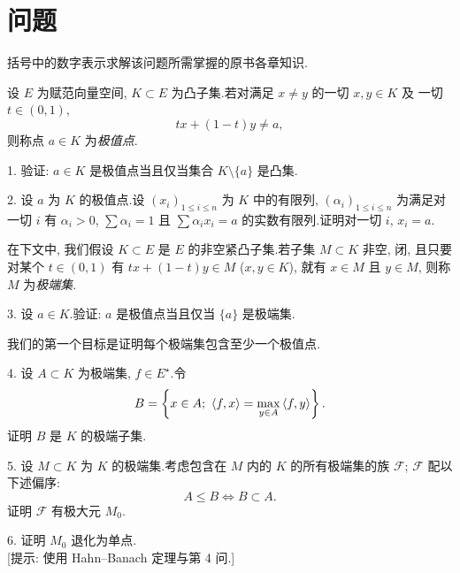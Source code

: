 
\chapter*{问题}

括号中的数字表示求解该问题所需掌握的原书各章知识.

\begin{problem}
\label{prob:1}
设 $E$ 为赋范向量空间, $K\subset E$ 为凸子集.若对满足 $x\ne y$ 的一切 $x,y\in K$ 及
一切 $t\in(0,1)$,
\begin{equation*}
tx+(1-t)y\ne a,
\end{equation*}
则称点 $a\in K$ 为\emph{极值点}.

1. 验证: $a\in K$ 是极值点当且仅当集合 $K\setminus\{a\}$ 是凸集.

2. 设 $a$ 为 $K$ 的极值点.设 $(x_i)_{1\le i\le n}$ 为 $K$ 中的有限列,
$(\alpha_i)_{1\le i\le n}$ 为满足对一切 $i$ 有 $\alpha_i>0$, $\sum\alpha_i=1$ 且
$\sum\alpha_ix_i=a$ 的实数有限列.证明对一切 $i$, $x_i=a$.

在下文中, 我们假设 $K\subset E$ 是 $E$ 的非空紧凸子集.若子集 $M\subset K$
非空, 闭, 且只要对某个 $t\in(0,1)$ 有 $tx+(1-t)y\in M$ ($x,y\in K$), 就有
$x\in M$ 且 $y\in M$, 则称 $M$ 为\emph{极端集}.

3. 设 $a\in K$.验证: $a$ 是极值点当且仅当 $\{a\}$ 是极端集.

我们的第一个目标是证明每个极端集包含至少一个极值点.

4. 设 $A\subset K$ 为极端集, $f\in E^\star$.令
\begin{equation*}
B=\left\{x\in A;\ \left\langle f,x\right\rangle=\max_{y\in A}\left\langle f,y\right\rangle\right\}.
\end{equation*}
证明 $B$ 是 $K$ 的极端子集.

5. 设 $M\subset K$ 为 $K$ 的极端集.考虑包含在 $M$ 内的 $K$ 的所有极端集的族
$\mathcal{F}$; $\mathcal{F}$ 配以下述偏序:
\begin{equation*}
A\le B\iff B\subset A.
\end{equation*}
证明 $\mathcal{F}$ 有极大元 $M_0$.

6. 证明 $M_0$ 退化为单点.\\
{[提示: 使用 Hahn--Banach 定理与第 4 问.]}


\end{problem}
